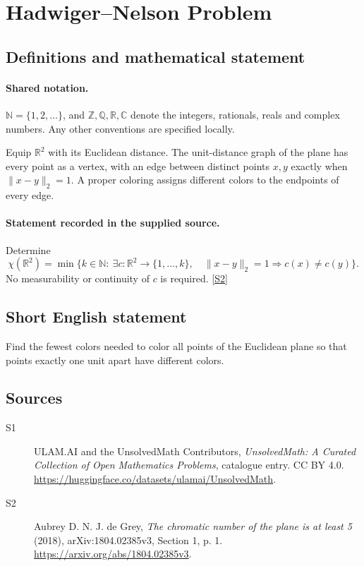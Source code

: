 \documentclass[11pt]{article}
\newcommand{\sref}[2]{\hyperlink{source:#1:#2}{[S#2]}}
\begin{document}
\section{Hadwiger–Nelson Problem}\label{statement}

\subsection{Definitions and mathematical statement}

\paragraph{Shared notation.}$\mathbb N=\{1,2,\ldots\}$, and $\mathbb Z,\mathbb Q,\mathbb R,\mathbb C$ denote the integers, rationals, reals and complex numbers. Any other conventions are specified locally.


Equip $\mathbb R^2$ with its Euclidean distance. The unit-distance graph of the plane has every point as a vertex, with an edge between distinct points $x,y$ exactly when $\|x-y\|_2=1$. A proper coloring assigns different colors to the endpoints of every edge.
\paragraph{Statement recorded in the supplied source.}
Determine
\[
 \chi(\mathbb R^2)=\min\bigl\{k\in\mathbb N:\ \exists c:\mathbb R^2\to\{1,\ldots,k\},\quad
 \|x-y\|_2=1\Longrightarrow c(x)\ne c(y)\bigr\}.
\]
No measurability or continuity of $c$ is required. \sref{statement}{2}
\subsection{Short English statement}
Find the fewest colors needed to color all points of the Euclidean plane so that points exactly one unit apart have different colors.
\subsection{Sources}
\begin{description}
\item[\hypertarget{source:statement:1}{S1}] ULAM.AI and the UnsolvedMath Contributors, \emph{UnsolvedMath: A Curated Collection of Open Mathematics Problems}, catalogue entry. CC BY 4.0. \url{https://huggingface.co/datasets/ulamai/UnsolvedMath}.
\item[\hypertarget{source:statement:2}{S2}] Aubrey D. N. J. de Grey, \emph{The chromatic number of the plane is at least 5} (2018), arXiv:1804.02385v3, Section 1, p. 1. \url{https://arxiv.org/abs/1804.02385v3}.
\end{description}
\label{end:statement}
\end{document}
